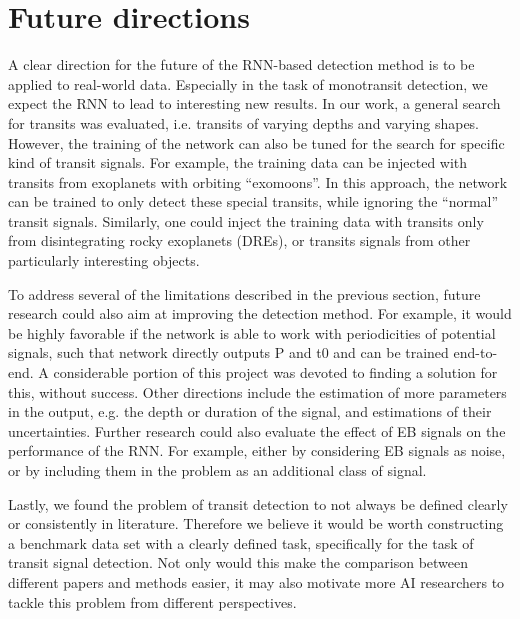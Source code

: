 
\section{Future directions}

A clear direction for the future of the RNN-based detection method is to be applied to real-world data. Especially in the task of monotransit detection, we expect the RNN to lead to interesting new results. In our work, a general search for transits was evaluated, i.e. transits of varying depths and varying shapes. However, the training of the network can also be tuned for the search for specific kind of transit signals. For example, the training data can be injected with transits from exoplanets with orbiting ``exomoons''.  In this approach, the network can be trained to only detect these special transits, while ignoring the ``normal'' transit signals. Similarly, one could inject the training data with transits only from disintegrating rocky exoplanets (DREs), or transits signals from other particularly interesting  objects.

To address several of the limitations described in the previous section, future research could also aim at improving the detection method. For example, it would be highly favorable if the network is able to work with periodicities of potential signals, such that network directly outputs P and t0 and can be trained end-to-end. A considerable portion of this project was devoted to finding a solution for this, without success.  Other directions include the
estimation of more parameters in the output, e.g. the depth or duration of the signal, and estimations of their uncertainties. Further research could also evaluate the effect of EB signals on the performance of the RNN. For example, either by considering EB signals as noise, or by including them in the problem as an additional class of signal.

Lastly, we found the problem of transit detection to not always be defined clearly or consistently in literature.  Therefore we believe it would be worth constructing a benchmark data set with a clearly defined task, specifically for the task of transit signal detection. Not only would this make the comparison between different papers and methods easier, it may also motivate more AI researchers to tackle this problem from different perspectives.